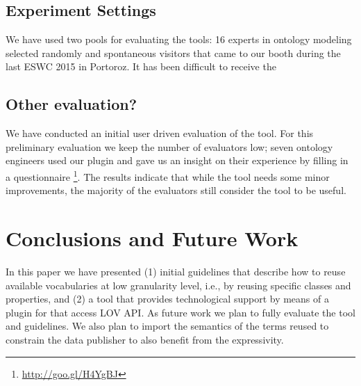 
\subsection{Experiment Settings}
We have used two pools for evaluating the tools: 16 experts in ontology modeling selected randomly and spontaneous visitors that came to our booth during the last ESWC 2015 in Portoroz. It has been difficult to receive the 
 
\subsection{Other evaluation?}

We have conducted an initial user driven evaluation of the tool. For this preliminary evaluation we keep the number of evaluators low; seven ontology engineers used our plugin and gave us an insight on their experience by filling in a questionnaire \footnote{\url{http://goo.gl/H4YgBJ}}. The results indicate that while the tool needs some minor improvements, the majority of the evaluators still consider the tool to be useful.


\section{Conclusions and Future Work}
\label{sec:conclusions}
In this paper we have presented (1) initial guidelines that describe how to reuse available vocabularies at low granularity level, i.e., by reusing specific classes and properties, and (2) a tool that provides technological support by means of a plugin for \protege that access LOV API. As future work we plan to fully evaluate the tool and guidelines. We also plan to import the semantics of the terms reused to constrain the data publisher to also benefit from the expressivity.     


